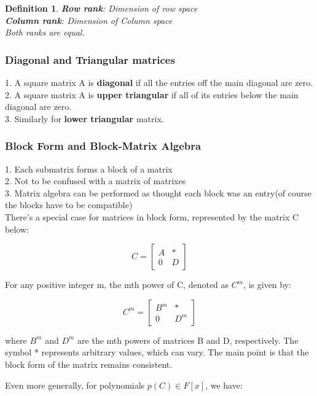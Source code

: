 \documentclass[12pt]{article}
\newtheorem{definition}{Definition}
\begin{document}
\begin{definition}
\textbf{Row rank}: Dimension of row space\\
\textbf{Column rank}: Dimension of Column space\\

Both ranks are equal.
\end{definition}


\subsubsection{Diagonal and Triangular matrices}
1. A square matrix A is \textbf{diagonal} if all the entries off the main diagonal are zero.\\
2. A square matrix A is \textbf{upper triangular} if all of its entries below the main diagonal are zero.\\
3. Similarly for \textbf{lower triangular} matrix.\\

\subsubsection{Block Form and Block-Matrix Algebra}

1. Each submatrix forms a block of a matrix\\
2. Not to be confused with a matrix of matrixes\\
3. Matrix algebra can be performed as thought each block was an entry(of course the blocks have to be compatible)\\

There's a special case for matrices in block form, represented by the matrix C below:

\[
C = \begin{bmatrix}
A & * \\
0 & D
\end{bmatrix}
\]

For any positive integer m, the mth power of C, denoted as \(C^m\), is given by:

\[
C^m = \begin{bmatrix}
B^m & * \\
0 & D^m
\end{bmatrix}
\]

where \(B^m\) and \(D^m\) are the mth powers of matrices B and D, respectively. The symbol * represents arbitrary values, which can vary. The main point is that the block form of the matrix remains consistent.

Even more generally, for polynomials \(p(C) \in F[x]\), we have:
\end{document}

